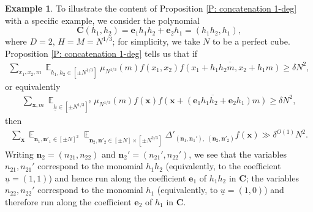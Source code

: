 \documentclass[11pt]{amsart}
\theoremstyle{definition}
\newtheorem{example}[lemma]{Example} %
\DeclareMathOperator*{\E}{\mathbb{E}}
\newcommand{\bc}{{\textbf{C}}}
\newcommand{\bn}{{\mathbf{n}}}
\newcommand{\be}{{\mathbf{e}}}
\newcommand{\bx}{{\textbf{x}}}
\newcommand{\uh}{{\underline{h}}}
\newcommand{\uu}{{\underline{u}}}
\begin{document}
\begin{example}\label{E: example of 1-deg concatenation}
To illustrate the content of Proposition \ref{P: concatenation 1-deg} with a specific example, we consider the polynomial $$\bc(h_1, h_2) = \be_1h_1 h_2 + \be_2 h_1 = (h_1 h_2, h_1),$$
where $D = 2$, $H=M=N^{1/3}$; for simplicity, we take $N$ to be a perfect cube.
Proposition \ref{P: concatenation 1-deg} tells us that if
\begin{align*}
    \sum_{x_1, x_2, m} \E_{h_1, h_2\in[\pm N^{1/3}]} \mu_{N^{1/3}}(m) f(x_1, x_2) \overline{f(x_1 + h_1h_2m, x_2 +h_1 m)}\geq \delta N^2,
\end{align*}
or equivalently
\begin{align*}
    \sum_{\bx, m}\E_{\uh\in[\pm N^{1/3}]^2} \mu_{N^{1/3}}(m) f(\bx)\overline{f(\bx + (\be_1h_1h_2 + \be_2 h_1)m)}\geq \delta N^2,
\end{align*}
then
\begin{align*}
    \sum_{\bx}\E_{\bn_1, \bn'_1\in[\pm N]^2}\E_{\bn_2, \bn'_2\in[\pm N]\times [\pm N^{2/3}]} \Delta'_{(\bn_1,\bn_1'),\; (\bn_2, \bn'_2)}f(\bx)\gg \delta^{O(1)}N^{2}.
\end{align*}
Writing $\bn_2 = (n_{21}, n_{22})$ and $\bn_2'=(n_{21}', n_{22}')$, we see that the variables $n_{21}, n_{21}'$ correspond to the monomial $h_1 h_2$ (equivalently, to the coefficient $\uu = (1,1)$) and hence run along the coefficient $\be_1$ of $h_1h_2$ in $\bc$; the variables $n_{22}, n_{22}'$ correspond to the monomial $h_1$ (equivalently, to $\uu = (1,0)$) and therefore run along the coefficient $\be_2$ of $h_1$ in $\bc$.
\end{example}
\end{document}
